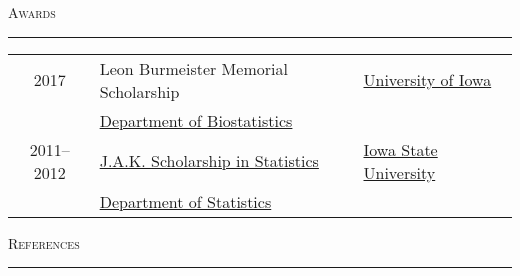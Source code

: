 \documentclass[a4paper]{article}
\newcommand{\deptbiostat}{\href{https://www.public-health.uiowa.edu/biostat/}{Department of Biostatistics}}
\newcommand{\uiowa}{\href{https://www.uiowa.edu}{University of Iowa}}
\newcommand{\isu}{\href{https://www.iastate.edu/}{Iowa State University}}
\newcommand{\deptstat}{\href{https://stat.iastate.edu/}{Department of Statistics}}
\newcommand{\jakscholar}{\href{https://www.stat.iastate.edu/undergraduate-scholarship-and-awards}{J.A.K. Scholarship in Statistics}}
\begin{document}
\begin{flushleft}
  \Large\textsc{Awards}
  \textcolor{usafagrey}{\rule[0.5\baselineskip]{\textwidth}{0.75pt}}
\end{flushleft}
\vspace{-\baselineskip}

\begin{tabular*}{0.9\textwidth}{@{\extracolsep{\fill}}cll}
  2017 & Leon Burmeister Memorial Scholarship & \uiowa \\
       & \deptbiostat & \\[3pt]
  2011--2012 & \jakscholar & \isu \\
            & \deptstat
\end{tabular*}
\vspace{0.25\baselineskip}

\begin{flushleft}
  \Large\textsc{References}
  \textcolor{usafagrey}{\rule[0.5\baselineskip]{\textwidth}{0.75pt}}
\end{flushleft}

\end{document}
